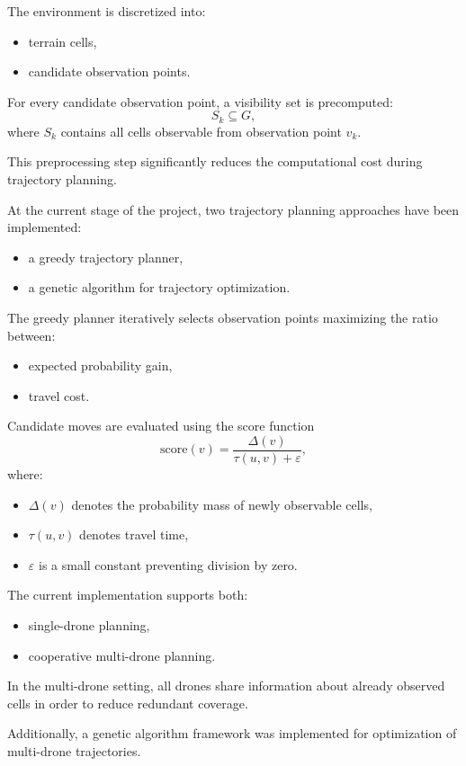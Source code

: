 \documentclass[english]{projectreport}
\begin{document}
The environment is discretized into:
\begin{itemize}
    \item terrain cells,
    \item candidate observation points.
\end{itemize}

For every candidate observation point, a visibility set is precomputed:
\[
S_k \subseteq G,
\]
where $S_k$ contains all cells observable from observation point $v_k$.

This preprocessing step significantly reduces the computational cost during trajectory planning.

At the current stage of the project, two trajectory planning approaches have been implemented:
\begin{itemize}
    \item a greedy trajectory planner,
    \item a genetic algorithm for trajectory optimization.
\end{itemize}

The greedy planner iteratively selects observation points maximizing the ratio between:
\begin{itemize}
    \item expected probability gain,
    \item travel cost.
\end{itemize}

Candidate moves are evaluated using the score function
\[
\mathrm{score}(v)=
\frac{\Delta(v)}
{\tau(u,v)+\varepsilon},
\]
where:
\begin{itemize}
    \item $\Delta(v)$ denotes the probability mass of newly observable cells,
    \item $\tau(u,v)$ denotes travel time,
    \item $\varepsilon$ is a small constant preventing division by zero.
\end{itemize}

The current implementation supports both:
\begin{itemize}
    \item single-drone planning,
    \item cooperative multi-drone planning.
\end{itemize}

In the multi-drone setting, all drones share information about already observed cells in order to reduce redundant coverage.

Additionally, a genetic algorithm framework was implemented for optimization of multi-drone trajectories.
\end{document}
